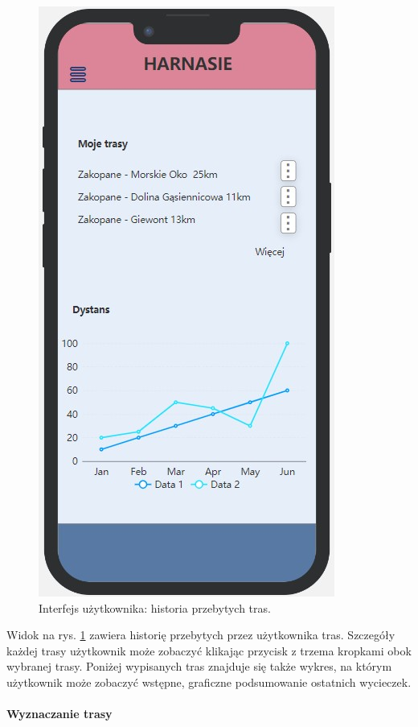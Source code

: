     \begin{figure}[H]
        \centering
        \includegraphics[scale=0.5]{img/interfejsy/if_historia.jpg}
        \caption{Interfejs użytkownika: historia przebytych tras.}
        \label{interfejs:historia}
    \end{figure}
   Widok na rys. \ref{interfejs:historia} zawiera historię przebytych przez użytkownika tras. Szczegóły każdej trasy użytkownik może zobaczyć klikając przycisk z trzema kropkami obok wybranej trasy. Poniżej wypisanych tras znajduje się także wykres, na którym użytkownik może zobaczyć wstępne, graficzne podsumowanie ostatnich wycieczek. \\
   \\
   \textbf{Wyznaczanie trasy}
